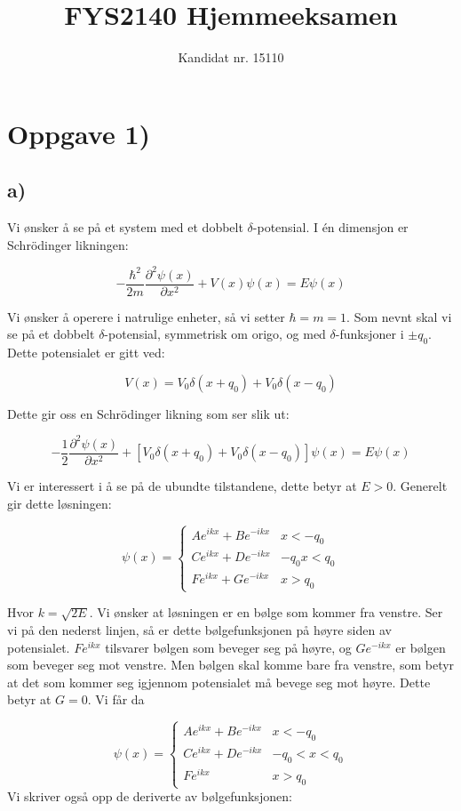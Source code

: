 \documentclass[a4paper,norsk, 10pt]{article}
\title{FYS2140 Hjemmeeksamen}
\author{Kandidat nr. 15110}
\numberwithin{equation}{section}
\begin{document}
\maketitle

\section{Oppgave 1)}
\subsection*{a)}
Vi ønsker å se på et system med et dobbelt $\delta$-potensial. I én dimensjon er Schrödinger likningen:

$$
-\frac{\hbar^2}{2m}\frac{\partial^2 \psi(x)}{\partial x^2} + V(x)\psi(x) = E\psi(x)
$$

Vi ønsker å operere i natrulige enheter, så vi setter $\hbar = m = 1$. Som nevnt skal vi se på et dobbelt $\delta$-potensial, symmetrisk om origo, og med $\delta$-funksjoner i $\pm q_0$. Dette potensialet er gitt ved:

$$
V(x) = V_0\delta(x+q_0) + V_0\delta(x-q_0)
$$

Dette gir oss en Schrödinger likning som ser slik ut:

\begin{equation}
-\frac{1}{2}\frac{\partial^2 \psi(x)}{\partial x^2} + \left[V_0\delta(x+q_0) + V_0\delta(x-q_0)\right]\psi(x) = E\psi(x)
\label{eq:deltaSchr}
\end{equation}

Vi er interessert i å se på de ubundte tilstandene, dette betyr at $E>0$. Generelt gir dette løsningen:

$$
\psi(x) = 
\begin{cases}
Ae^{ikx} + Be^{-ikx} & x< -q_0 \\
Ce^{ikx} + De^{-ikx} & -q_0x< q_0 \\
Fe^{ikx} + Ge^{-ikx} & x>q_0 
\end{cases}
$$

Hvor $k = \sqrt{2E}$. Vi ønsker at løsningen er en bølge som kommer fra venstre. Ser vi på den nederst linjen, så er dette bølgefunksjonen på høyre siden av potensialet. $Fe^{ikx}$ tilsvarer bølgen som beveger seg på høyre, og $Ge^{-ikx}$ er bølgen som beveger seg mot venstre. Men bølgen skal komme bare fra venstre, som betyr at det som kommer seg igjennom potensialet må bevege seg mot høyre. Dette betyr at $G = 0$. Vi får da

\begin{equation}
\psi(x) = 
\begin{cases}
Ae^{ikx} + Be^{-ikx} & x< -q_0 \\
Ce^{ikx} + De^{-ikx} & -q_0 < x< q_0 \\
Fe^{ikx} & x>q_0 
\end{cases}
\label{eq:psi}
\end{equation}
\newpage
Vi skriver også opp de deriverte av bølgefunksjonen:
\end{document}
